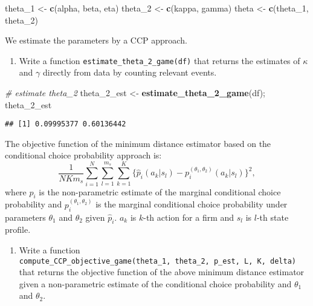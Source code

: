 \documentclass[
]{book}
\newenvironment{Shaded}{\begin{snugshade}}{\end{snugshade}}
\newcommand{\CommentTok}[1]{\textcolor[rgb]{0.56,0.35,0.01}{\textit{#1}}}
\newcommand{\DecValTok}[1]{\textcolor[rgb]{0.00,0.00,0.81}{#1}}
\newcommand{\KeywordTok}[1]{\textcolor[rgb]{0.13,0.29,0.53}{\textbf{#1}}}
\newcommand{\NormalTok}[1]{#1}
\newcommand{\StringTok}[1]{\textcolor[rgb]{0.31,0.60,0.02}{#1}}
\providecommand{\tightlist}{%
  \setlength{\itemsep}{0pt}\setlength{\parskip}{0pt}}
\begin{document}
\begin{Shaded}
\begin{Highlighting}[]
\NormalTok{theta_}\DecValTok{1}\NormalTok{ <-}\StringTok{ }\KeywordTok{c}\NormalTok{(alpha, beta, eta)}
\NormalTok{theta_}\DecValTok{2}\NormalTok{ <-}\StringTok{ }\KeywordTok{c}\NormalTok{(kappa, gamma)}
\NormalTok{theta <-}\StringTok{ }\KeywordTok{c}\NormalTok{(theta_}\DecValTok{1}\NormalTok{, theta_}\DecValTok{2}\NormalTok{)}
\end{Highlighting}
\end{Shaded}

We estimate the parameters by a CCP approach.

\begin{enumerate}
\def\labelenumi{\arabic{enumi}.}
\tightlist
\item
  Write a function \texttt{estimate\_theta\_2\_game(df)} that returns the estimates of \(\kappa\) and \(\gamma\) directly from data by counting relevant events.
\end{enumerate}

\begin{Shaded}
\begin{Highlighting}[]
\CommentTok{# estimate theta_2}
\NormalTok{theta_}\DecValTok{2}\NormalTok{_est <-}\StringTok{ }\KeywordTok{estimate_theta_2_game}\NormalTok{(df); theta_}\DecValTok{2}\NormalTok{_est}
\end{Highlighting}
\end{Shaded}

\begin{verbatim}
## [1] 0.09995377 0.60136442
\end{verbatim}

The objective function of the minimum distance estimator based on the conditional choice probability approach is:
\[
\frac{1}{N K m_s} \sum_{i = 1}^N \sum_{l = 1}^{m_s} \sum_{k = 1}^{K}\{\hat{p}_i(a_k|s_l) - p_i^{(\theta_1, \theta_2)}(a_k|s_l)\}^2,
\]
where \(\hat{p}_i\) is the non-parametric estimate of the marginal conditional choice probability and \(p_i^{(\theta_1, \theta_2)}\) is the marginal conditional choice probability under parameters \(\theta_1\) and \(\theta_2\) given \(\hat{p}_i\). \(a_k\) is \(k\)-th action for a firm and \(s_l\) is \(l\)-th state profile.

\begin{enumerate}
\def\labelenumi{\arabic{enumi}.}
\setcounter{enumi}{1}
\tightlist
\item
  Write a function \texttt{compute\_CCP\_objective\_game(theta\_1,\ theta\_2,\ p\_est,\ L,\ K,\ delta)} that returns the objective function of the above minimum distance estimator given a non-parametric estimate of the conditional choice probability and \(\theta_1\) and \(\theta_2\).
\end{enumerate}
\end{document}
